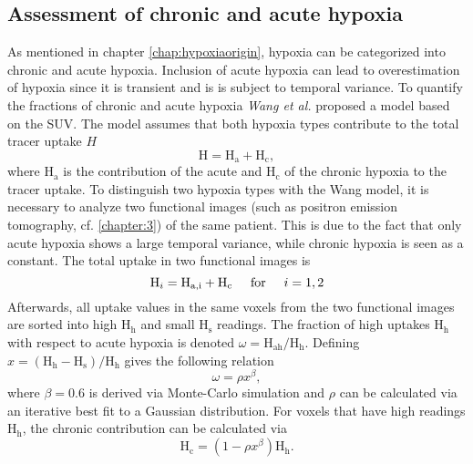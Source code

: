 \subsection{Assessment of chronic and acute hypoxia}\label{chapt:chronicacute}
As mentioned in chapter \ref{chap:hypoxiaorigin}, hypoxia can be categorized into chronic and acute hypoxia. Inclusion of acute hypoxia can lead to overestimation of hypoxia since it is transient and is is subject to temporal variance. To quantify the fractions of chronic and acute hypoxia \textit{Wang et al.} \cite{pmid19928070} proposed a model based on the SUV. The model assumes that both hypoxia types contribute to the total tracer uptake $H$
\begin{equation}
\mathrm{H} = \mathrm{H}_\mathrm{a} + \mathrm{H}_\mathrm{c},
\end{equation}
where $ \mathrm{H}_\mathrm{a}$ is the contribution of the acute and $ \mathrm{H}_\mathrm{c}$ of the chronic hypoxia to the tracer uptake. To distinguish two hypoxia types with the Wang model, it is necessary to analyze two functional images (such as positron emission tomography, cf. \ref{chapter:3}) of the same patient. This is due to the fact that only acute hypoxia shows a large temporal variance, while chronic hypoxia is seen as a constant. The total uptake in two functional images is
\begin{equation}
\mathrm{H}_i = \mathrm{H}_\mathrm{a,i} + \mathrm{H}_\mathrm{c} \hspace{0.5cm}\mathrm{for}\hspace{0.5cm}i=1,2
\end{equation}
Afterwards, all uptake values in the same voxels from the two functional images are sorted into high H$_\mathrm{h}$ and small H$_\mathrm{s}$ readings. The fraction of high uptakes H$_\mathrm{h}$ with respect to acute hypoxia is denoted $\omega = \mathrm{H}_\mathrm{ah}/\mathrm{H}_\mathrm{h}$. Defining $x = (\mathrm{H}_\mathrm{h} - \mathrm{H}_\mathrm{s})/\mathrm{H}_\mathrm{h}$ gives the following relation
\begin{equation}
\omega = \rho x^\beta,
\end{equation}
where $\beta=0.6$ is derived via Monte-Carlo simulation and $\rho$ can be calculated via an iterative best fit to a Gaussian distribution. For voxels that have high readings H$_\mathrm{h}$, the chronic contribution can be calculated via
\begin{equation}
\mathrm{H}_\mathrm{c} = (1-\rho x^\beta)\mathrm{H}_\mathrm{h}.
\end{equation}
